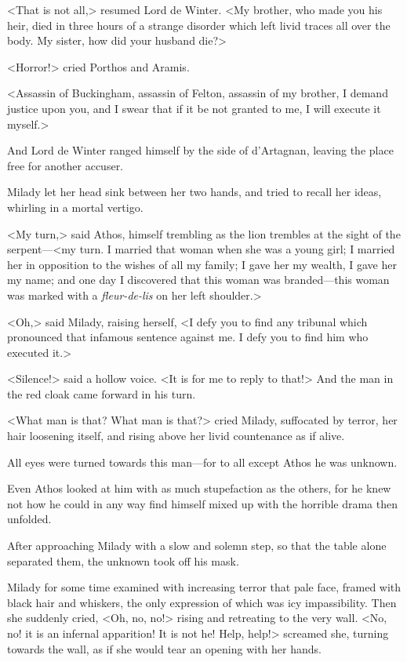 <That is not all,> resumed Lord de Winter. <My brother, who made you his heir, died in three hours of a strange disorder which left livid traces all over the body. My sister, how did your husband die?> 

<Horror!> cried Porthos and Aramis. 

<Assassin of Buckingham, assassin of Felton, assassin of my brother, I demand justice upon you, and I swear that if it be not granted to me, I will execute it myself.> 

And Lord de Winter ranged himself by the side of d'Artagnan, leaving the place free for another accuser. 

Milady let her head sink between her two hands, and tried to recall her ideas, whirling in a mortal vertigo. 

<My turn,> said Athos, himself trembling as the lion trembles at the sight of the serpent---<my turn. I married that woman when she was a young girl; I married her in opposition to the wishes of all my family; I gave her my wealth, I gave her my name; and one day I discovered that this woman was branded---this woman was marked with a \textit{fleur-de-lis} on her left shoulder.> 

<Oh,> said Milady, raising herself, <I defy you to find any tribunal which pronounced that infamous sentence against me. I defy you to find him who executed it.> 

<Silence!> said a hollow voice. <It is for me to reply to that!> And the man in the red cloak came forward in his turn. 

<What man is that? What man is that?> cried Milady, suffocated by terror, her hair loosening itself, and rising above her livid countenance as if alive. 

All eyes were turned towards this man---for to all except Athos he was unknown. 

Even Athos looked at him with as much stupefaction as the others, for he knew not how he could in any way find himself mixed up with the horrible drama then unfolded. 

After approaching Milady with a slow and solemn step, so that the table alone separated them, the unknown took off his mask. 

Milady for some time examined with increasing terror that pale face, framed with black hair and whiskers, the only expression of which was icy impassibility. Then she suddenly cried, <Oh, no, no!> rising and retreating to the very wall. <No, no! it is an infernal apparition! It is not he! Help, help!> screamed she, turning towards the wall, as if she would tear an opening with her hands. 

